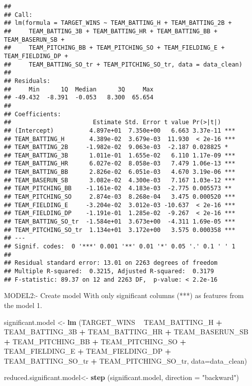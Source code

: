 \documentclass[]{article}
\newenvironment{Shaded}{\begin{snugshade}}{\end{snugshade}}
\newcommand{\KeywordTok}[1]{\textcolor[rgb]{0.13,0.29,0.53}{\textbf{#1}}}
\newcommand{\DataTypeTok}[1]{\textcolor[rgb]{0.13,0.29,0.53}{#1}}
\newcommand{\StringTok}[1]{\textcolor[rgb]{0.31,0.60,0.02}{#1}}
\newcommand{\OperatorTok}[1]{\textcolor[rgb]{0.81,0.36,0.00}{\textbf{#1}}}
\newcommand{\NormalTok}[1]{#1}
\begin{document}
\begin{verbatim}
## 
## Call:
## lm(formula = TARGET_WINS ~ TEAM_BATTING_H + TEAM_BATTING_2B + 
##     TEAM_BATTING_3B + TEAM_BATTING_HR + TEAM_BATTING_BB + TEAM_BASERUN_SB + 
##     TEAM_PITCHING_BB + TEAM_PITCHING_SO + TEAM_FIELDING_E + TEAM_FIELDING_DP + 
##     TEAM_BATTING_SO_tr + TEAM_PITCHING_SO_tr, data = data_clean)
## 
## Residuals:
##     Min      1Q  Median      3Q     Max 
## -49.432  -8.391  -0.053   8.300  65.654 
## 
## Coefficients:
##                       Estimate Std. Error t value Pr(>|t|)    
## (Intercept)          4.897e+01  7.350e+00   6.663 3.37e-11 ***
## TEAM_BATTING_H       4.389e-02  3.679e-03  11.930  < 2e-16 ***
## TEAM_BATTING_2B     -1.982e-02  9.063e-03  -2.187 0.028825 *  
## TEAM_BATTING_3B      1.011e-01  1.655e-02   6.110 1.17e-09 ***
## TEAM_BATTING_HR      6.027e-02  8.058e-03   7.479 1.06e-13 ***
## TEAM_BATTING_BB      2.826e-02  6.051e-03   4.670 3.19e-06 ***
## TEAM_BASERUN_SB      3.082e-02  4.300e-03   7.167 1.03e-12 ***
## TEAM_PITCHING_BB    -1.161e-02  4.183e-03  -2.775 0.005573 ** 
## TEAM_PITCHING_SO     2.874e-03  8.268e-04   3.475 0.000520 ***
## TEAM_FIELDING_E     -3.204e-02  3.012e-03 -10.637  < 2e-16 ***
## TEAM_FIELDING_DP    -1.191e-01  1.285e-02  -9.267  < 2e-16 ***
## TEAM_BATTING_SO_tr  -1.584e+01  3.673e+00  -4.311 1.69e-05 ***
## TEAM_PITCHING_SO_tr  1.134e+01  3.172e+00   3.575 0.000358 ***
## ---
## Signif. codes:  0 '***' 0.001 '**' 0.01 '*' 0.05 '.' 0.1 ' ' 1
## 
## Residual standard error: 13.01 on 2263 degrees of freedom
## Multiple R-squared:  0.3215, Adjusted R-squared:  0.3179 
## F-statistic: 89.37 on 12 and 2263 DF,  p-value: < 2.2e-16
\end{verbatim}

MODEL2:- Create model With only significant columns (***) as features
from the model 1.

\begin{Shaded}
\begin{Highlighting}[]
\NormalTok{significant.model <-}\StringTok{ }\KeywordTok{lm}\NormalTok{ (TARGET_WINS }\OperatorTok{~}\StringTok{ }\NormalTok{TEAM_BATTING_H }\OperatorTok{+}\StringTok{ }\NormalTok{TEAM_BATTING_3B }\OperatorTok{+}\StringTok{ }\NormalTok{TEAM_BATTING_HR }\OperatorTok{+}\StringTok{ }\NormalTok{TEAM_BASERUN_SB }\OperatorTok{+}\StringTok{ }\NormalTok{TEAM_PITCHING_BB }\OperatorTok{+}\StringTok{ }\NormalTok{TEAM_PITCHING_SO }\OperatorTok{+}\StringTok{ }\NormalTok{TEAM_FIELDING_E }\OperatorTok{+}\StringTok{ }\NormalTok{TEAM_FIELDING_DP }\OperatorTok{+}\StringTok{ }\NormalTok{TEAM_BATTING_SO_tr }\OperatorTok{+}\StringTok{ }\NormalTok{TEAM_PITCHING_SO_tr, }\DataTypeTok{data=}\NormalTok{data_clean)}

\NormalTok{reduced.significant.model<-}\StringTok{ }\KeywordTok{step}\NormalTok{ (significant.model, }\DataTypeTok{direction =} \StringTok{"backward"}\NormalTok{)}
\end{Highlighting}
\end{Shaded}
\end{document}
